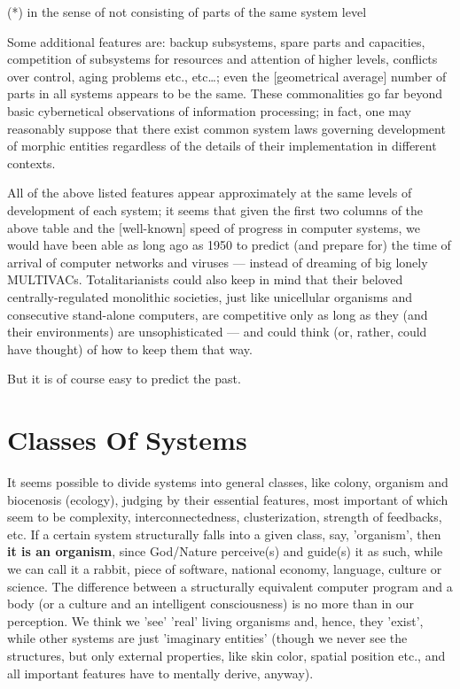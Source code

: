 \vspace{5mm}
 (*) in the sense of not consisting of parts of the same system level

     Some additional features are:  backup subsystems, spare parts and
capacities,  competition  of subsystems for resources and attention of
higher levels, conflicts over control, aging  problems  etc.,  etc\dots;
even  the [geometrical average] number of parts in all systems appears
to be the same.  These commonalities go far beyond basic  cybernetical
observations  of  information  processing; in fact, one may reasonably
suppose that there exist common system laws governing  development  of
morphic  entities regardless of the details of their implementation in
different contexts.

     All of the above listed features appear approximately at the same
levels  of  development  of each system; it seems that given the first
two columns of the above table and the [well-known] speed of  progress
in  computer  systems,  we would have been able as long ago as 1950 to
predict (and prepare for) the time of arrival of computer networks and
viruses   ---   instead   of   dreaming   of   big   lonely   MULTIVACs.
Totalitarianists  could  also  keep  in  mind   that   their   beloved
centrally-regulated   monolithic   societies,  just  like  unicellular
organisms and consecutive stand-alone computers, are competitive  only
as  long  as  they  (and their environments) are unsophisticated --- and
could think (or, rather, could have thought) of how to keep them  that
way.


     But it is of course easy to predict the past.





\section{Classes Of Systems}

     It seems possible to divide systems into  general  classes,  like
colony,  organism and biocenosis (ecology), judging by their essential
features,  most  important   of   which   seem   to   be   complexity,
interconnectedness,  clusterization, strength of feedbacks, etc.  If a
certain system structurally falls into a given class, say, 'organism',
then  {\bf it  is an organism}, since God/Nature perceive(s) and guide(s) it
as such, while we can call it a rabbit, piece  of  software,  national
economy,  language,  culture  or  science.   The  difference between a
structurally equivalent computer program and a body (or a culture  and
an  intelligent  consciousness) is no more than in our perception.  We
think we 'see' 'real' living organisms and, hence, they 'exist', while
other  systems  are just 'imaginary entities' (though we never see the
structures, but only external properties,  like  skin  color,  spatial
position  etc.,  and  all  important features have to mentally derive,
anyway).

